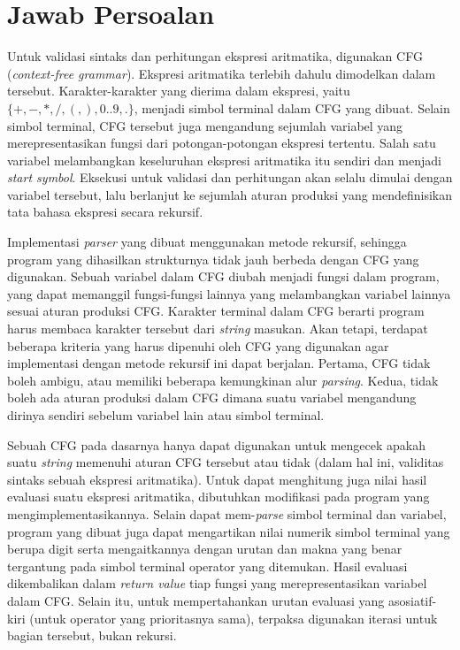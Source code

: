 \documentclass[a4paper,titlepage]{article}
\begin{document}
	\section{Jawab Persoalan}

		Untuk validasi sintaks dan perhitungan ekspresi aritmatika, digunakan CFG (\textit{context-free grammar}). Ekspresi aritmatika terlebih dahulu dimodelkan dalam  tersebut. Karakter-karakter yang dierima dalam ekspresi, yaitu $\{+, -, *, /, (, ), 0..9, .\}$, menjadi simbol terminal dalam CFG yang dibuat. Selain simbol terminal, CFG tersebut juga mengandung sejumlah variabel yang merepresentasikan fungsi dari potongan-potongan ekspresi tertentu. Salah satu variabel melambangkan keseluruhan ekspresi aritmatika itu sendiri dan menjadi \textit{start symbol}. Eksekusi untuk validasi dan perhitungan akan selalu dimulai dengan variabel tersebut, lalu berlanjut ke sejumlah aturan produksi yang mendefinisikan tata bahasa ekspresi secara rekursif.

		Implementasi \textit{parser} yang dibuat menggunakan metode rekursif, sehingga program yang dihasilkan strukturnya tidak jauh berbeda dengan CFG yang digunakan. Sebuah variabel dalam CFG diubah menjadi fungsi dalam program, yang dapat memanggil fungsi-fungsi lainnya yang melambangkan variabel lainnya sesuai aturan produksi CFG. Karakter terminal dalam CFG berarti program harus membaca karakter tersebut dari \textit{string} masukan. Akan tetapi, terdapat beberapa kriteria yang harus dipenuhi oleh CFG yang digunakan agar implementasi dengan metode rekursif ini dapat berjalan. Pertama, CFG tidak boleh ambigu, atau memiliki beberapa kemungkinan alur \textit{parsing}. Kedua, tidak boleh ada aturan produksi dalam CFG dimana suatu variabel mengandung dirinya sendiri sebelum variabel lain atau simbol terminal.

		Sebuah CFG pada dasarnya hanya dapat digunakan untuk mengecek apakah suatu \textit{string} memenuhi aturan CFG tersebut atau tidak (dalam hal ini, validitas sintaks sebuah ekspresi aritmatika). Untuk dapat menghitung juga nilai hasil evaluasi suatu ekspresi aritmatika, dibutuhkan modifikasi pada program yang mengimplementasikannya. Selain dapat mem-\textit{parse} simbol terminal dan variabel, program yang dibuat juga dapat mengartikan nilai numerik simbol terminal yang berupa digit serta mengaitkannya dengan urutan dan makna yang benar tergantung pada simbol terminal operator yang ditemukan. Hasil evaluasi dikembalikan dalam \textit{return value} tiap fungsi yang merepresentasikan variabel dalam CFG. Selain itu, untuk mempertahankan urutan evaluasi yang asosiatif-kiri (untuk operator yang prioritasnya sama), terpaksa digunakan iterasi untuk bagian tersebut, bukan rekursi.
\end{document}
